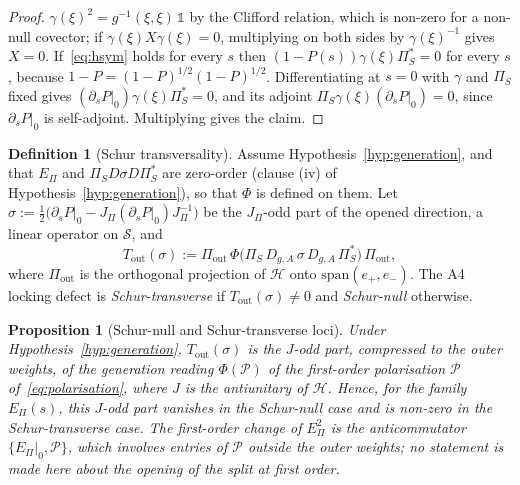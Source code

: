 \documentclass[11pt]{article}
\newtheorem{proposition}{Proposition}
\theoremstyle{definition}
\newtheorem{definition}{Definition}
\newcommand{\EPi}{E_\Pi}
\newcommand{\PiS}{\Pi_S}
\begin{document}
    \begin{proof}
      $\gamma(\xi)^2=g^{-1}(\xi,\xi)\,\mathbb 1$ by the Clifford relation, which is non-zero for a non-null covector;
      if $\gamma(\xi)X\gamma(\xi)=0$, multiplying on both sides by $\gamma(\xi)^{-1}$ gives $X=0$.
      If~\eqref{eq:hsym} holds for every $s$ then $(1-P(s))\gamma(\xi)\PiS^{*}=0$ for every $s$, because
      $1-P=(1-P)^{1/2}(1-P)^{1/2}$.
      Differentiating at $s=0$ with $\gamma$ and $\PiS$ fixed gives $(\partial_sP|_0)\gamma(\xi)\PiS^{*}=0$, and its
      adjoint $\PiS\gamma(\xi)(\partial_sP|_0)=0$, since $\partial_sP|_0$ is self-adjoint.
      Multiplying gives the claim.
    \end{proof}

    \begin{definition}[Schur transversality]
      \label{def:schur-transversality}
      Assume Hypothesis~\ref{hyp:generation}, and that $\EPi$ and $\PiS D\sigma D\PiS^{*}$ are zero-order
      (clause (iv) of Hypothesis~\ref{hyp:generation}), so that $\Phi$ is defined on them.
      Let $\sigma:=\tfrac12\big(\partial_sP|_0-J_\Pi(\partial_sP|_0)J_\Pi^{-1}\big)$ be the $J_\Pi$-odd part of the
      opened direction, a linear operator on $\mathcal S$, and
      \begin{equation}
        \label{eq:transversality}
        T_{\mathrm{out}}(\sigma):=\Pi_{\mathrm{out}}\,\Phi\big(\PiS\,D_{g,A}\,\sigma\,D_{g,A}\,\PiS^{*}\big)\,
        \Pi_{\mathrm{out}},
      \end{equation}
      where $\Pi_{\mathrm{out}}$ is the orthogonal projection of $\mathcal H$ onto $\mathrm{span}(e_+,e_-)$.
      The A4 locking defect is \emph{Schur-transverse} if $T_{\mathrm{out}}(\sigma)\neq0$ and \emph{Schur-null}
      otherwise.
    \end{definition}

    \begin{proposition}[Schur-null and Schur-transverse loci]
      \label{prop:schur-dichotomy}
      Under Hypothesis~\ref{hyp:generation}, $T_{\mathrm{out}}(\sigma)$ is the $J$-odd part, compressed to the outer
      weights, of the generation reading $\Phi(\mathcal P)$ of the first-order polarisation $\mathcal P$
      of~\eqref{eq:polarisation}, where $J$ is the antiunitary of $\mathcal H$.
      Hence, for the family $\EPi(s)$, this $J$-odd part vanishes in the Schur-null case and is non-zero in the
      Schur-transverse case.
      The first-order change of $\EPi^2$ is the anticommutator $\{\EPi|_0,\mathcal P\}$, which involves entries of
      $\mathcal P$ outside the outer weights; no statement is made here about the opening of the split at first order.
    \end{proposition}
\end{document}

